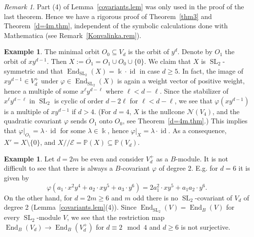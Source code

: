 \documentclass{amsart}
\theoremstyle{definition}
\newtheorem{exa}[thm]{Example}
\theoremstyle{remark}
\newtheorem{rem}[thm]{Remark}
\begin{document}
\begin{rem} 
Part (4) of Lemma~\ref{covariants.lem} was only used in the proof of the last theorem.
Hence we have a rigorous proof of Theorem~\ref{thm3} and Theorem~\ref{d=4m.thm}, independent of the symbolic calculations done with Mathematica (see Remark~\ref{Konvalinka.rem}).
\end{rem} 
\begin{exa}
The minimal orbit $O_{0} {\subseteq} V_{d}$ is the orbit of $y^{d}$. Denote by $O_{1}$ the orbit of $xy^{d-1}$. Then $X:=\overline{O_{1}} = O_{1}\cup O_{0}\cup \{0\}$. We claim that $X$ is ${\operatorname{SL}_{2}}$-symmetric and that $\operatorname{End}_{\operatorname{SL}_{2}}(X) = {\Bbbk}\cdot\operatorname{id}$ in case $d \geq 5$. In fact, the image of $xy^{d-1}\in V_{d}^{+}$ under ${\varphi}\in\operatorname{End}_{\operatorname{SL}_{2}}(X)$ is again a weight vector of positive weight, hence a multiple of some $x^{\ell}y^{d-\ell}$ where  $\ell < d- \ell$. Since the stabilizer of $x^{\ell}y^{d-\ell}$ in ${\operatorname{SL}_{2}}$ is cyclic of order $d-2\ell$ for 
$\ell < d-\ell$, we see that ${\varphi}(xy^{d-1})$ is a multiple of $xy^{d-1}$ if $d>4$. (For $d=4$, $X$ is the nullcone ${\mathcal N}(V_{4})$, and the quadratic covariant ${\varphi}$ sends $O_{1}$ onto $O_{0}$, see Theorem~\ref{d=4m.thm}.) This implies that ${\varphi}|_{O_{1}} = \lambda\cdot \operatorname{id}$ for some $\lambda \in{\Bbbk}$, hence ${\varphi}|_{X} = \lambda\cdot \operatorname{id}$. As a consequence, $X'=X \setminus\{0\}$, and $X{/\!\!/} {\mathcal E} = {\mathbb P}(X) {\subseteq} {\mathbb P}(V_{d})$.
\end{exa}

\begin{exa}\label{non-liftable-VF.exa}
Let $d =2m$ be even and consider $V_{d}^{+}$ as a $B$-module. It is not difficult to see that there is always a $B$-covariant ${\varphi}$ of degree 2. E.g. for $d=6$ it is given by 
$$
{\varphi}(a_{1}\cdot x^{2}y^{4}+a_{2}\cdot xy^{5}+a_{3}\cdot y^{6}) =  2a_{1}^{2}\cdot xy^{5} + a_{1}a_{2}\cdot y^{6}.
$$
On the other hand, for $d=2m\geq 6$ and $m$ odd there is no ${\operatorname{SL}_{2}}$-covariant of $V_{d}$ of degree 2 (Lemma~\ref{covariants.lem}(4)).
Since $\operatorname{End}_{\operatorname{SL}_{2}}(V)=\operatorname{End}_{B}(V)$ for every ${\operatorname{SL}_{2}}$-module $V$, we see that the restriction map $\operatorname{End}_{B}(V_{d}) \to \operatorname{End}_{B}(V_{d}^{+})$ for $d\equiv 2\mod 4$ and $d\geq 6$ is not surjective.
\end{exa}
\addtocounter{section}{1}
\setcounter{subsection}{0}
\end{document}
